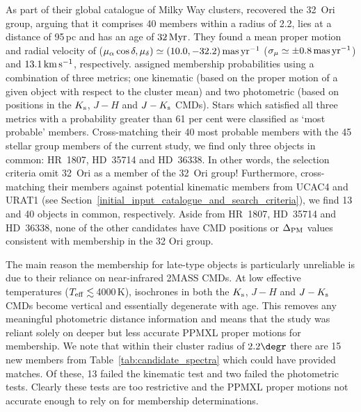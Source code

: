 \documentclass[usenatbib]{mnras}
\begin{document}
As part of their global catalogue of Milky Way clusters,
\cite{Kharchenko13} recovered the 32~Ori group, arguing that it
comprises 40 members within a radius of 2.2\degr, lies at a distance
of 95\,pc and has an age of $32\,\rm{Myr}$. They found a mean proper
motion and radial velocity of ($\mu_{\alpha}\cos\delta, \mu_{\delta})
\simeq (10.0, -32.2)\,\rm{mas\,yr^{-1}}$ ($\sigma_{\mu} \simeq
\pm0.8\,\rm{mas\,yr^{-1}}$) and $13.1\,\rm{km\,s^{-1}}$,
respectively. \citeauthor{Kharchenko13} assigned membership
probabilities using a combination of three metrics; one kinematic
(based on the proper motion of a given object with respect to the
cluster mean) and two photometric (based on positions in the
$K_{\rm{s}}$, $J-H$ and $J-K_{\rm{s}}$ CMDs). Stars which
satisfied all three metrics with a probability greater than 61 per
cent were classified as `most probable' members. Cross-matching their
40 most probable members with the 45 stellar group members of the
current study, we find only three objects in common: HR~1807, HD~35714
and HD~36338. In other words, the \citeauthor{Kharchenko13} selection
criteria omit 32~Ori as a member of the 32~Ori group! Furthermore,
cross-matching their members against potential kinematic members from
UCAC4 and URAT1 (see
Section~\ref{initial_input_catalogue_and_search_criteria}), we find 13
and 40 objects in common, respectively. Aside from HR~1807, HD~35714
and HD~36338, none of the other candidates have CMD positions or
$\Delta_{\rm PM}$ values consistent with membership in the 32 Ori
group.

The main reason the \cite{Kharchenko13} membership for late-type
objects is particularly unreliable is due to their reliance on
near-infrared 2MASS CMDs. At low effective temperatures ($T_{\rm{eff}}
\lesssim$\,4000\,K), isochrones in both the $K_{\rm{s}}$, $J-H$
and $J-K_{\rm{s}}$ CMDs become vertical and essentially degenerate
with age. This removes any meaningful photometric distance information
and means that the study was reliant solely on deeper but less
accurate PPMXL proper motions for membership. We note that within
their cluster radius of $2.2\degr$ there are 15 new members from
Table~\ref{tab:candidate_spectra} which could have provided
matches. Of these, 13 failed the kinematic test and two failed the
photometric tests. Clearly these tests are too restrictive and the
PPMXL proper motions not accurate enough to rely on for membership
determinations.
\end{document}
